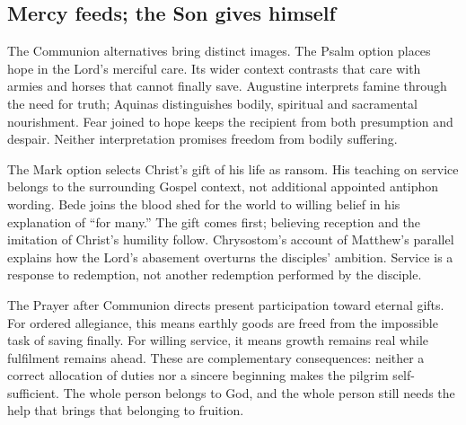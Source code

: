 \subsection{Mercy feeds; the Son gives himself}
The Communion alternatives bring distinct images. The Psalm option places hope in the Lord's merciful care. Its wider context contrasts that care with armies and horses that cannot finally save. Augustine interprets famine through the need for truth; Aquinas distinguishes bodily, spiritual and sacramental nourishment. Fear joined to hope keeps the recipient from both presumption and despair. Neither interpretation promises freedom from bodily suffering.

The Mark option selects Christ's gift of his life as ransom. His teaching on service belongs to the surrounding Gospel context, not additional appointed antiphon wording. Bede joins the blood shed for the world to willing belief in his explanation of ``for many.'' The gift comes first; believing reception and the imitation of Christ's humility follow. Chrysostom's account of Matthew's parallel explains how the Lord's abasement overturns the disciples' ambition. Service is a response to redemption, not another redemption performed by the disciple.

The Prayer after Communion directs present participation toward eternal gifts. For ordered allegiance, this means earthly goods are freed from the impossible task of saving finally. For willing service, it means growth remains real while fulfilment remains ahead. These are complementary consequences: neither a correct allocation of duties nor a sincere beginning makes the pilgrim self-sufficient. The whole person belongs to God, and the whole person still needs the help that brings that belonging to fruition.
